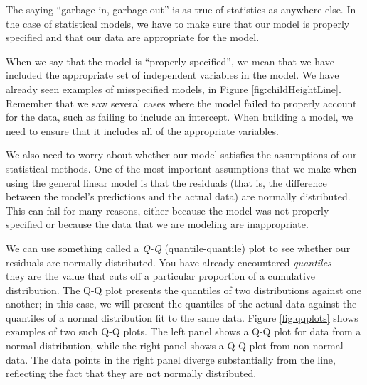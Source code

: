 \documentclass[12pt,]{book}
\theoremstyle{definition}
\theoremstyle{definition}
\theoremstyle{definition}
\theoremstyle{remark}
\begin{document}
The saying ``garbage in, garbage out'' is as true of statistics as anywhere else. In the case of statistical models, we have to make sure that our model is properly specified and that our data are appropriate for the model.

When we say that the model is ``properly specified'', we mean that we have included the appropriate set of independent variables in the model. We have already seen examples of misspecified models, in Figure \ref{fig:childHeightLine}. Remember that we saw several cases where the model failed to properly account for the data, such as failing to include an intercept. When building a model, we need to ensure that it includes all of the appropriate variables.

We also need to worry about whether our model satisfies the assumptions of our statistical methods. One of the most important assumptions that we make when using the general linear model is that the residuals (that is, the difference between the model's predictions and the actual data) are normally distributed. This can fail for many reasons, either because the model was not properly specified or because the data that we are modeling are inappropriate.

We can use something called a \emph{Q-Q} (quantile-quantile) plot to see whether our residuals are normally distributed. You have already encountered \emph{quantiles} --- they are the value that cuts off a particular proportion of a cumulative distribution. The Q-Q plot presents the quantiles of two distributions against one another; in this case, we will present the quantiles of the actual data against the quantiles of a normal distribution fit to the same data. Figure \ref{fig:qqplots} shows examples of two such Q-Q plots. The left panel shows a Q-Q plot for data from a normal distribution, while the right panel shows a Q-Q plot from non-normal data. The data points in the right panel diverge substantially from the line, reflecting the fact that they are not normally distributed.
\end{document}
